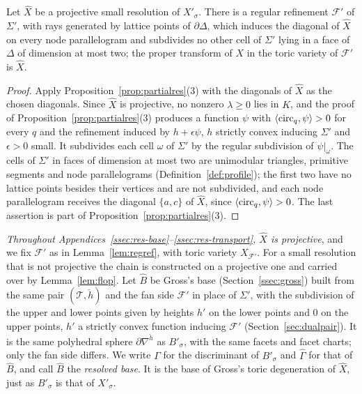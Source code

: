 \begin{lemma}\label{lem:regref}
Let $\widehat X$ be a projective small resolution of $X'_\sigma$. There is a regular refinement $\mathcal F'$ of $\Sigma'$, with
rays generated by lattice points of $\partial\Delta$, which induces the diagonal of $\widehat X$ on every node parallelogram
and subdivides no other cell of $\Sigma'$ lying in a face of $\Delta$ of dimension at most two; the proper transform of $X$ in
the toric variety of $\mathcal F'$ is $\widehat X$.
\end{lemma}
\begin{proof}
Apply Proposition~\ref{prop:partialres}(3) with the diagonals of $\widehat X$ as the chosen diagonals. Since $\widehat X$ is
projective, no nonzero $\lambda\ge0$ lies in $K$, and the proof of Proposition~\ref{prop:partialres}(3) produces a function
$\psi$ with $\langle\mathrm{circ}_q,\psi\rangle>0$ for every $q$ and the refinement induced by $h+\epsilon\psi$, $h$ strictly convex
inducing $\Sigma'$ and $\epsilon>0$ small. It subdivides each cell $\omega$ of $\Sigma'$ by the regular subdivision of
$\psi|_\omega$. The cells of $\Sigma'$ in faces of dimension at most two are unimodular triangles, primitive segments and node
parallelograms (Definition~\ref{def:profile}); the first two have no lattice points besides their vertices and are not
subdivided, and each node parallelogram receives the diagonal $\{a,c\}$ of $\widehat X$, since $\langle\mathrm{circ}_q,\psi\rangle>0$.
The last assertion is part of Proposition~\ref{prop:partialres}(3).
\end{proof}

\emph{Throughout Appendices~\ref{ssec:res-base}--\ref{ssec:res-transport}, $\widehat X$ is projective}, and we fix
$\mathcal F'$ as in Lemma~\ref{lem:regref}, with toric variety $X_{\mathcal F'}$. For
a small resolution that is not projective the chain is constructed on a projective one and carried over by
Lemma~\ref{lem:flop}. Let $\widehat B$ be Gross's base (Section~\ref{ssec:gross}) built from the same pair
$(\mathcal T,\check h)$ and the fan side $\mathcal F'$ in place of $\Sigma'$, with the subdivision of the upper and lower
points given by heights $h'$ on the lower points and $0$ on the upper points, $h'$ a strictly convex function inducing
$\mathcal F'$ (Section~\ref{sec:dualpair}). It is the same polyhedral sphere $\partial\nabla^{\check h}$ as $B'_\sigma$,
with the same facets and facet charts; only the fan side differs. We write $\Gamma$ for the discriminant of $B'_\sigma$ and
$\widehat\Gamma$ for that of $\widehat B$, and call $\widehat B$ the \emph{resolved base}. It is the base of Gross's toric
degeneration of $\widehat X$, just as $B'_\sigma$ is that of $X'_\sigma$.

